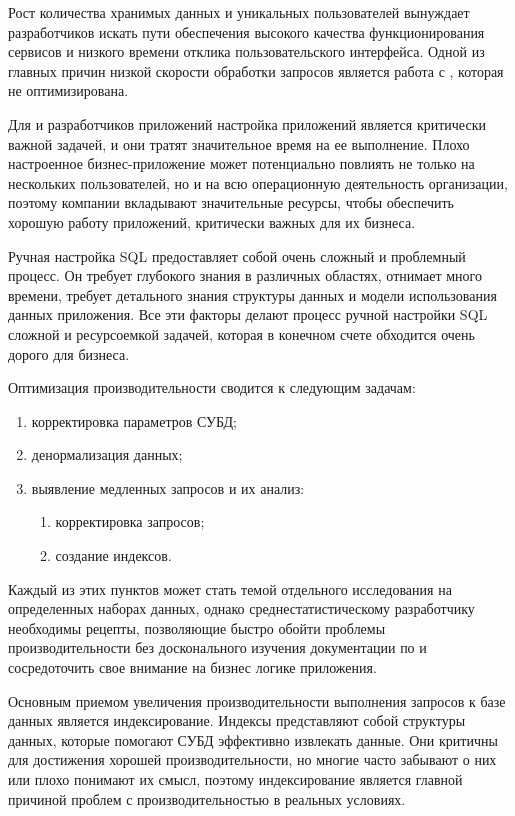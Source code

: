 \Introduction
\pagestyle{plain}

Рост количества хранимых данных и уникальных пользователей вынуждает разработчиков искать пути обеспечения высокого качества функционирования сервисов и низкого времени отклика пользовательского интерфейса. Одной из главных причин низкой скорости обработки запросов является работа с , которая не оптимизирована.  \cite{article:tsiganov}

Для  и разработчиков приложений настройка приложений является критически важной задачей, и они тратят значительное время на ее выполнение. Плохо настроенное бизнес-приложение может потенциально повлиять не только на нескольких пользователей, но и на всю операционную деятельность организации, поэтому компании вкладывают значительные ресурсы, чтобы обеспечить хорошую работу приложений, критически важных для их бизнеса.\cite{fors.ru:Oracle-Database}

Ручная настройка SQL предоставляет собой очень сложный и проблемный процесс. Он требует глубокого знания в различных областях, отнимает много времени, требует детального знания структуры данных и модели использования данных приложения. Все эти факторы делают процесс ручной настройки SQL сложной и ресурсоемкой задачей, которая в конечном счете обходится очень дорого для бизнеса. \cite{fors.ru:Oracle-Database}

Оптимизация производительности сводится к следующим задачам: 
\begin{enumerate}
\item корректировка параметров СУБД;
\item денормализация данных;
\item выявление медленных запросов и их анализ:
    \begin{enumerate}
    \item корректировка запросов;
    \item создание индексов.
    \end{enumerate}
\end{enumerate}

Каждый из этих пунктов может стать темой отдельного исследования на определенных наборах данных, однако среднестатистическому разработчику необходимы рецепты, позволяющие быстро обойти проблемы производительности без досконального изучения документации по  и сосредоточить свое внимание на бизнес логике приложения. \cite{article:tsiganov}

Основным приемом увеличения производительности выполнения запросов к базе данных является индексирование. Индексы представляют собой структуры данных, которые помогают СУБД эффективно извлекать данные. Они критичны для достижения хорошей производительности, но многие часто забывают о них или плохо понимают их смысл, поэтому индексирование является главной причиной проблем с производительностью в реальных условиях. \cite{zaitsev}

